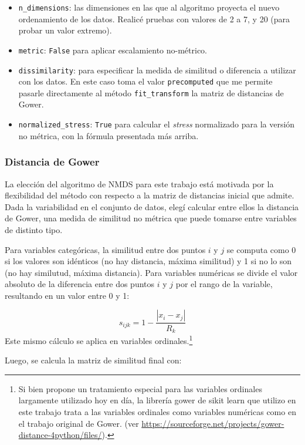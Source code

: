 \documentclass[10 pt]{article}
\begin{document}
\begin{itemize}
   \item \texttt{n\_dimensions}: las dimensiones en las que al algoritmo proyecta el nuevo ordenamiento de los datos. Realicé pruebas con valores de 2 a 7, y 20 (para probar un valor extremo).
   \item \texttt{metric}: \texttt{False} para aplicar escalamiento no-métrico. 
   \item \texttt{dissimilarity}: para especificar la medida de similitud o diferencia a utilizar con los datos. En este caso toma el valor \texttt{precomputed} que me permite pasarle directamente al método \texttt{fit\_transform} la matriz de distancias de Gower.
   \item \texttt{normalized\_stress}: \texttt{True} para calcular el \textit{stress} normalizado para la versión no métrica, con la fórmula presentada más arriba.
\end{itemize}

\subsubsection*{Distancia de Gower}

La elección del algoritmo de NMDS para este trabajo está motivada por la flexibilidad del método con respecto a la matriz de distancias inicial que admite. Dada la variabilidad en el conjunto de datos, elegí calcular entre ellos la distancia de Gower, una medida de similitud no métrica que puede tomarse entre variables de distinto tipo.

Para variables categóricas, la similitud entre dos puntos \(i\) y \(j\) se computa como 0 si los valores son idénticos (no hay distancia, máxima similitud) y 1 si no lo son (no hay similutud, máxima distancia). 
Para variables numéricas se divide el valor absoluto de la diferencia entre dos puntos \(i\) y \(j\) por el rango de la variable, resultando en un valor entre 0 y 1:   

\[s_{ijk} = 1-\frac{|x_{i} - x_{j}|}{R_{k}}\]
Este mismo cálculo se aplica en variables ordinales.\footnote{Si bien \cite{podani1999extending} propone un tratamiento especial para las variables ordinales largamente utilizado hoy en día, la librería gower de sikit learn que utilizo en este trabajo trata a las variables ordinales como variables numéricas como en el trabajo original de Gower. (ver \url{https://sourceforge.net/projects/gower-distance-4python/files/}).} 

Luego, se calcula la matriz de similitud final con:
\end{document}
